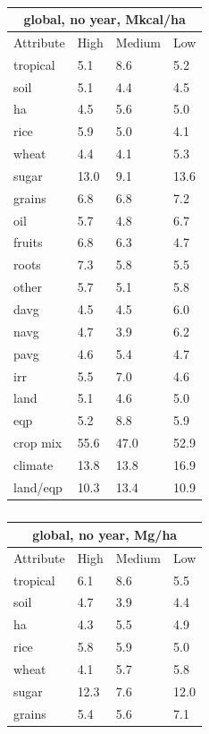 \documentclass[11pt]{article}
\begin{document}
\begin{table}[h!]
\parbox{.45\linewidth} {
\centering
\begin{tabular}{llll}
\toprule
\multicolumn{4}{c}{\textbf{global, no year, Mkcal/ha}} \\
\midrule
Attribute & High & Medium & Low \\
\midrule
tropical & 5.1 & 8.6 & 5.2 \\
soil & 5.1 & 4.4 & 4.5 \\
ha & 4.5 & 5.6 & 5.0 \\
rice & 5.9 & 5.0 & 4.1 \\
wheat & 4.4 & 4.1 & 5.3 \\
sugar & 13.0 & 9.1 & 13.6 \\
grains & 6.8 & 6.8 & 7.2 \\
oil & 5.7 & 4.8 & 6.7 \\
fruits & 6.8 & 6.3 & 4.7 \\
roots & 7.3 & 5.8 & 5.5 \\
other & 5.7 & 5.1 & 5.8 \\
davg & 4.5 & 4.5 & 6.0 \\
navg & 4.7 & 3.9 & 6.2 \\
pavg & 4.6 & 5.4 & 4.7 \\
irr & 5.5 & 7.0 & 4.6 \\
land & 5.1 & 4.6 & 5.0 \\
eqp & 5.2 & 8.8 & 5.9 \\
\midrule
crop mix & 55.6 & 47.0 & 52.9 \\
climate & 13.8 & 13.8 & 16.9 \\
land/eqp & 10.3 & 13.4 & 10.9 \\
\bottomrule
\end{tabular}
\caption{ }
\label{k.ny.wt_percentages}
}
\parbox{.45\linewidth} {
\centering
\begin{tabular}{llll}
\toprule
\multicolumn{4}{c}{\textbf{global, no year, Mg/ha}} \\
\midrule
Attribute & High & Medium & Low \\
\midrule
tropical & 6.1 & 8.6 & 5.5 \\
soil & 4.7 & 3.9 & 4.4 \\
ha & 4.3 & 5.5 & 4.9 \\
rice & 5.8 & 5.9 & 5.0 \\
wheat & 4.1 & 5.7 & 5.8 \\
sugar & 12.3 & 7.6 & 12.0 \\
grains & 5.4 & 5.6 & 7.1 \\

\end{tabular}}
\end{table}
\end{document}
